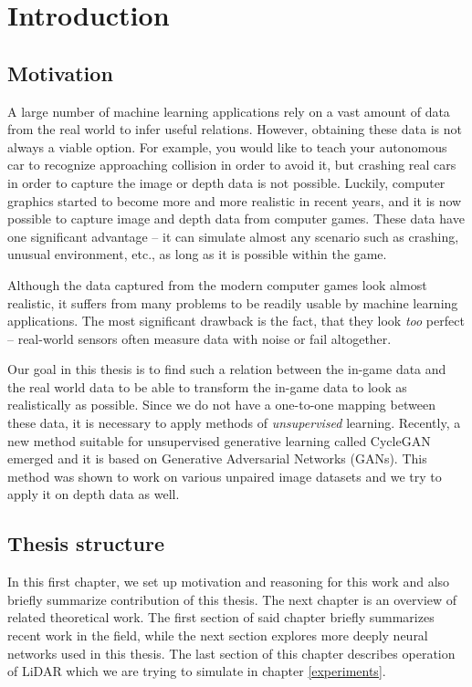 \chapter{Introduction}

\section{Motivation}

A large number of machine learning applications rely on a vast amount of data from the real world to infer useful relations. However, obtaining these data is not always a viable option. For example, you would like to teach your autonomous car to recognize approaching collision in order to avoid it, but crashing real cars in order to capture the image or depth data is not possible. Luckily, computer graphics started to become more and more realistic in recent years, and it is now possible to capture image and depth data from computer games. These data have one significant advantage -- it can simulate almost any scenario such as crashing, unusual environment, etc., as long as it is possible within the game.

Although the data captured from the modern computer games look almost realistic, it suffers from many problems to be readily usable by machine learning applications. The most significant drawback is the fact, that they look {\em too} perfect -- real-world sensors often measure data with noise or fail altogether.

Our goal in this thesis is to find such a relation between the in-game data and the real world data to be able to transform the in-game data to look as realistically as possible. Since we do not have a one-to-one mapping between these data, it is necessary to apply methods of {\em unsupervised} learning. Recently, a new method suitable for unsupervised generative learning called CycleGAN emerged and it is based on Generative Adversarial Networks (GANs). This method was shown to work on various unpaired image datasets and we try to apply it on depth data as well.

\section{Thesis structure}
In this first chapter, we set up motivation and reasoning for this work and also briefly summarize contribution of this thesis. The next chapter is an overview of related theoretical work. The first section of said chapter briefly summarizes recent work in the field, while the next section explores more deeply neural networks used in this thesis. The last section of this chapter describes operation of LiDAR which we are trying to simulate in chapter \ref{experiments}.

